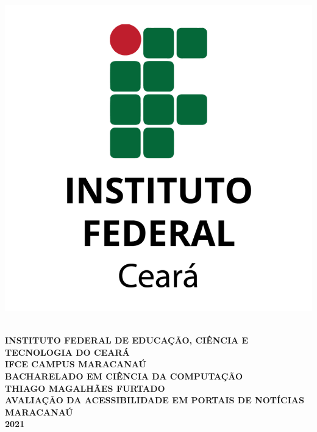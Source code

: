 \documentclass[a4paper]{article}
\begin{document}
\thispagestyle{empty}

\begin{titlepage}
	\vfill
	\begin{center}
		\onehalfspacing
		\parbox{6cm}{\includegraphics[scale=0.2]{logo.png}}\\
		\begingroup
		\fontsize{12pt}{0pt}\selectfont
		{\large \textbf{INSTITUTO FEDERAL DE EDUCAÇÃO, CIÊNCIA E TECNOLOGIA DO CEARÁ}}\\[0.2cm]
		\fontsize{12pt}{0pt}\selectfont
		{\large \textbf{IFCE CAMPUS MARACANAÚ}}\\[0.2cm]
		\fontsize{12pt}{0pt}\selectfont	
		{\large \textbf{BACHARELADO EM CIÊNCIA DA COMPUTAÇÃO}}\\[3.5cm]
		\fontsize{12pt}{0pt}\selectfont
		{\large \textbf{THIAGO MAGALHÃES FURTADO}}\\[3.5cm]
		\fontsize{12pt}{0pt}\selectfont
		{\large \textbf{AVALIAÇÃO DA ACESSIBILIDADE EM PORTAIS DE NOTÍCIAS}}\\[3.5cm]
		\fontsize{12pt}{0pt}\selectfont
		{\large \textbf{MARACANAÚ}}\\[0.2cm]
		\fontsize{12pt}{0pt}\selectfont
		{\large \textbf{2021}}
		\endgroup
	\end{center}
\end{titlepage}
\end{document}
